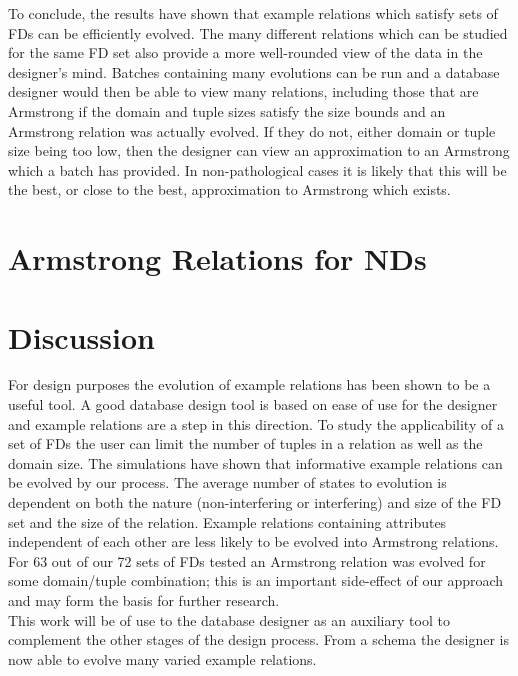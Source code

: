 \medskip


To conclude, the results have shown that example relations which satisfy sets
of FDs can be efficiently evolved. The many different
relations which can be studied for the same FD set also provide a
more well-rounded view of the data in the designer's mind.
Batches containing
many evolutions can be run and a database designer would then be able
to view many relations, including those that are Armstrong if the domain
and tuple sizes satisfy the size bounds and an Armstrong relation
was actually evolved.  If they do not, either domain
or tuple size being too low, then the designer can view an
approximation to an Armstrong which a batch has provided. In
non-pathological cases it is likely that
this will be the best, or close to the best, approximation to Armstrong
which exists.



\section{Armstrong Relations for NDs}\label{sec:nd_ar}


\section{Discussion}\label{sec:nd_disc}



For design purposes the evolution of example relations has been shown to
be a useful tool.  A good database
design tool is based on ease of use for the designer and example relations
are a step in this direction.  To  study the applicability of a set of FDs
 the user can limit the number of tuples in
a relation as well as the domain size. The simulations have shown that 
informative example relations can be evolved by our process.  The 
average number of states to evolution is dependent on both
the nature (non-interfering or interfering) and size of the FD set and the size of the relation.
Example relations containing attributes independent of each other
are less likely to be evolved into Armstrong relations. For 63 out
of our 72 sets of FDs tested an Armstrong relation was evolved
for some domain/tuple combination; this is an important side-effect
of our approach and may form the basis for further research.\\

This work
will be of use to the database designer as an auxiliary tool to complement
the other stages of the design process.  From a schema the designer is now
 able to evolve many varied example relations.\\

